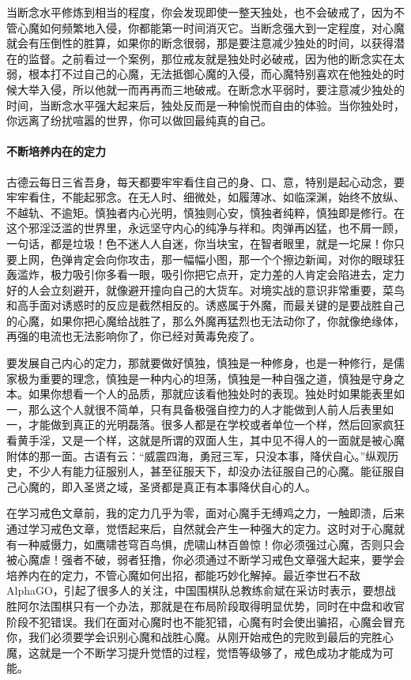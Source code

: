 当断念水平修炼到相当的程度，你会发现即使一整天独处，也不会破戒了，因为不管心魔如何频繁地入侵，你都能第一时间消灭它。当断念强大到一定程度，对心魔就会有压倒性的胜算，如果你的断念很弱，那是要注意减少独处的时间，以获得潜在的监督。之前看过一个案例，那位戒友就是独处时必破戒，因为他的断念实在太弱，根本打不过自己的心魔，无法抵御心魔的入侵，而心魔特别喜欢在他独处的时候大举入侵，所以他就一而再再而三地破戒。在断念水平弱时，要注意减少独处的时间，当断念水平强大起来后，独处反而是一种愉悦而自由的体验。当你独处时，你远离了纷扰喧嚣的世界，你可以做回最纯真的自己。

\paragraph{不断培养内在的定力}

古德云每日三省吾身，每天都要牢牢看住自己的身、口、意，特别是起心动念，要牢牢看住，不能起邪念。在无人时、细微处，如履薄冰、如临深渊，始终不放纵、不越轨、不逾矩。慎独者内心光明，慎独则心安，慎独者纯粹，慎独即是修行。在这个邪淫泛滥的世界里，永远坚守内心的纯净与祥和。肉弹再凶猛，也不屑一顾，一句话，都是垃圾！色不迷人人自迷，你当块宝，在智者眼里，就是一坨屎！你只要上网，色弹肯定会向你攻击，那一幅幅小图，那一个个擦边新闻，对你的眼球狂轰滥炸，极力吸引你多看一眼，吸引你把它点开，定力差的人肯定会陷进去，定力好的人会立刻避开，就像避开撞向自己的大货车。对境实战的意识非常重要，菜鸟和高手面对诱惑时的反应是截然相反的。诱惑属于外魔，而最关键的是要战胜自己的心魔，如果你把心魔给战胜了，那么外魔再猛烈也无法动你了，你就像绝缘体，再强的电流也无法影响你了，你已经对黄毒免疫了。

要发展自己内心的定力，那就要做好慎独，慎独是一种修身，也是一种修行，是儒家极为重要的理念，慎独是一种内心的坦荡，慎独是一种自强之道，慎独是守身之本。如果你想看一个人的品质，那就应该看他独处时的表现。独处时如果能表里如一，那么这个人就很不简单，只有具备极强自控力的人才能做到人前人后表里如一，才能做到真正的光明磊落。很多人都是在学校或者单位一个样，然后回家疯狂看黄手淫，又是一个样，这就是所谓的双面人生，其中见不得人的一面就是被心魔附体的那一面。古语有云：“威震四海，勇冠三军，只没本事，降伏自心。”纵观历史，不少人有能力征服别人，甚至征服天下，却没办法征服自己的心魔。能征服自己心魔的，即入圣贤之域，圣贤都是真正有本事降伏自心的人。

在学习戒色文章前，我的定力几乎为零，面对心魔手无缚鸡之力，一触即溃，后来通过学习戒色文章，觉悟起来后，自然就会产生一种强大的定力。这时对于心魔就有一种威慑力，如鹰啸苍穹百鸟惧，虎啸山林百兽惊！你必须强过心魔，否则只会被心魔虐！强者不破，弱者狂撸，你必须通过不断学习戒色文章强大起来，要学会培养内在的定力，不管心魔如何出招，都能巧妙化解掉。最近李世石不敌 AlphaGO，引起了很多人的关注，中国围棋队总教练俞斌在采访时表示，要想战胜阿尔法围棋只有一个办法，那就是在布局阶段取得明显优势，同时在中盘和收官阶段不犯错误。我们在面对心魔时也不能犯错，心魔有时会使出骗招，心魔会冒充你，我们必须要学会识别心魔和战胜心魔。从刚开始戒色的完败到最后的完胜心魔，这就是一个不断学习提升觉悟的过程，觉悟等级够了，戒色成功才能成为可能。

